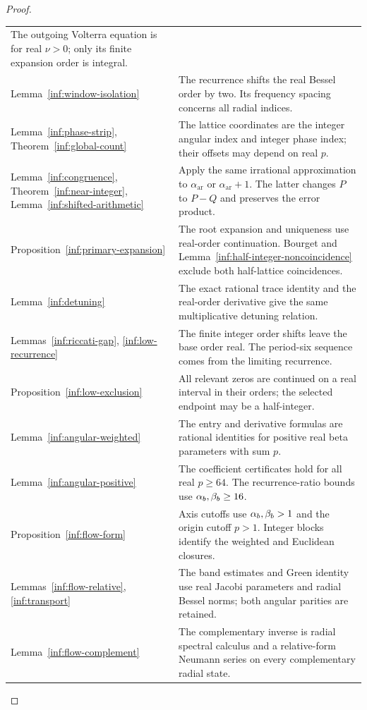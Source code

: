 \begin{proof}
\begin{longtable}{@{}>{\raggedright\arraybackslash}p{}>{\raggedright\arraybackslash}p{}@{}}
The outgoing Volterra equation is for real $\nu>0$;
only its finite expansion order is integral.\\
Lemma~\ref{inf:window-isolation} &
The recurrence shifts the real Bessel order by two.
Its frequency spacing concerns all radial indices.\\
Lemma~\ref{inf:phase-strip}, Theorem~\ref{inf:global-count} &
The lattice coordinates are the integer angular index and
integer phase index; their offsets may depend on real $p$.\\
Lemma~\ref{inf:congruence}, Theorem~\ref{inf:near-integer},
Lemma~\ref{inf:shifted-arithmetic} &
Apply the same irrational approximation to $\alpha_{\mathrm{ar}}$
or $\alpha_{\mathrm{ar}}+1$. The latter changes $P$ to $P-Q$
and preserves the error product.\\
Proposition~\ref{inf:primary-expansion} &
The root expansion and uniqueness use real-order continuation.
Bourget and Lemma~\ref{inf:half-integer-noncoincidence}
exclude both half-lattice coincidences.\\
Lemma~\ref{inf:detuning} &
The exact rational trace identity and the real-order derivative
give the same multiplicative detuning relation.\\
Lemmas~\ref{inf:riccati-gap}, \ref{inf:low-recurrence} &
The finite integer order shifts leave the base order real.
The period-six sequence comes from the limiting recurrence.\\
Proposition~\ref{inf:low-exclusion} &
All relevant zeros are continued on a real interval in their
orders; the selected endpoint may be a half-integer.\\
Lemma~\ref{inf:angular-weighted} &
The entry and derivative formulas are rational identities for
positive real beta parameters with sum $p$.\\
Lemma~\ref{inf:angular-positive} &
The coefficient certificates hold for all real $p\ge64$.
The recurrence-ratio bounds use $\alpha_b,\beta_b\ge16$.\\
Proposition~\ref{inf:flow-form} &
Axis cutoffs use $\alpha_b,\beta_b>1$ and the origin cutoff $p>1$.
Integer blocks identify the weighted and Euclidean closures.\\
Lemmas~\ref{inf:flow-relative}, \ref{inf:transport} &
The band estimates and Green identity use real Jacobi parameters
and radial Bessel norms; both angular parities are retained.\\
Lemma~\ref{inf:flow-complement} &
The complementary inverse is radial spectral calculus and a
relative-form Neumann series on every complementary radial state.\\

\end{longtable}
\end{proof}
